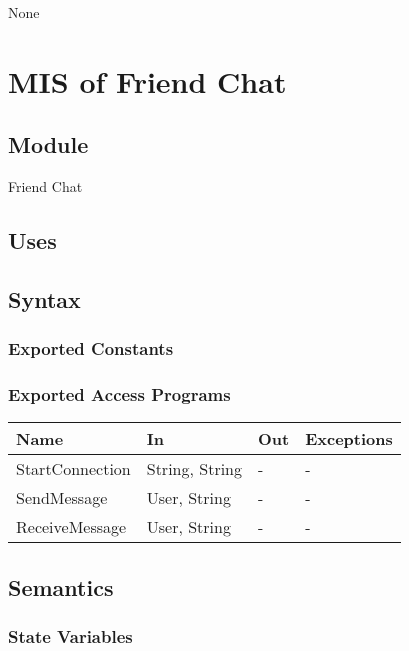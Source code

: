 \documentclass[12pt, titlepage]{article}
\begin{document}
None

\newpage

\section{MIS of Friend Chat} \label{mFC}

\subsection{Module}

Friend Chat

\subsection{Uses}

\subsection{Syntax}

\subsubsection{Exported Constants}

\subsubsection{Exported Access Programs}

\begin{center}
\begin{tabular}{p{2cm} p{4cm} p{4cm} p{2cm}}
\hline
\textbf{Name} & \textbf{In} & \textbf{Out} & \textbf{Exceptions} \\
\hline
StartConnection & String, String & - & - \\
SendMessage & User, String & - & - \\
ReceiveMessage & User, String & - & - \\

\hline
\end{tabular}
\end{center}

\subsection{Semantics}

\subsubsection{State Variables}
\end{document}
